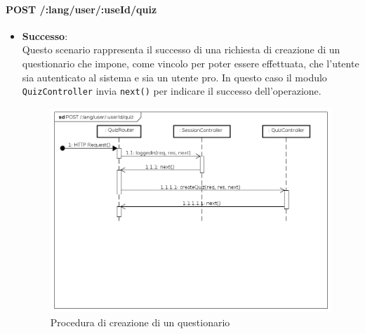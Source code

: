 \paragraph{POST /:lang/user/:useId/quiz} %
\begin{itemize}
\item \textbf{Successo}:\\
Questo scenario rappresenta il successo di una richiesta di creazione di un questionario che impone, come vincolo per poter essere effettuata, che l'utente sia autenticato al sistema e sia un utente pro. In questo caso il modulo \texttt{QuizController} invia \texttt{next()} per indicare il successo dell'operazione.
\label{Procedura di creazione di un questionario}
\begin{figure}[ht]
	\centering
	\includegraphics[scale=0.40]{UML/DiagrammiDiSequenza/Back-end/POST__lang_user_userId_quiz_success.png}
	\caption{Procedura di creazione di un questionario}
\end{figure}
\FloatBarrier


\end{itemize}
